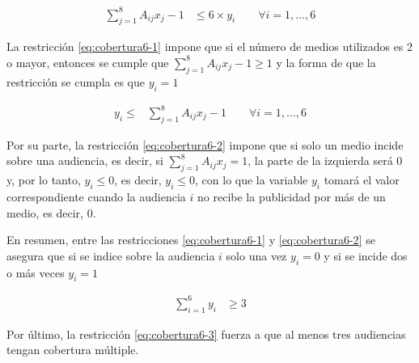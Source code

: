 \begin{align}
\sum_{j=1}^{8} A_{ij}x_j - 1 &\leq 6\times y_i \qquad \forall i=1,\dots,6 
\label{eq:cobertura6-1}
\end{align}

La restricción \ref{eq:cobertura6-1} impone que si el número de medios utilizados es 2 o mayor, entonces se cumple que $\sum_{j=1}^{8} A_{ij}x_j - 1 \geq 1$ y la forma de que la restricción se cumpla es que $y_i=1$


\begin{align}
y_i \leq & \sum_{j=1}^{8} A_{ij}x_j - 1 \qquad \forall i=1,\dots,6 
\label{eq:cobertura6-2}
\end{align}

Por su parte, la restricción \ref{eq:cobertura6-2} impone que si solo un medio incide sobre una audiencia, es decir, si $\sum_{j=1}^{8} A_{ij}x_j=1$, la parte de la izquierda será 0 y, por lo tanto, $y_i\leq 0$, es decir, $y_i\leq 0$, con lo que la variable $y_i$ tomará el valor correspondiente cuando la audiencia $i$ no recibe la publicidad por más de un medio, es decir, 0.

En resumen, entre las restricciones \ref{eq:cobertura6-1} y \ref{eq:cobertura6-2} se asegura que si se indice sobre la audiencia $i$ solo una vez $y_i=0$ y si se incide dos o más veces $y_i=1$


\begin{align}
\sum_{i=1}^{6} y_i &\geq 3
\label{eq:cobertura6-3}
\end{align}

\noindent
Por último, la restricción \ref{eq:cobertura6-3} fuerza a que al menos tres audiencias tengan cobertura múltiple.
